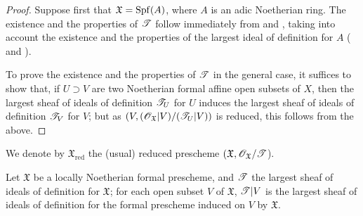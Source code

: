 \begin{proof}
Suppose first that $\mathfrak{X}=\operatorname{Spf}(A)$, where $A$ is an adic Noetherian ring.
The existence and the properties of $\mathscr{T}$ follow immediately from   and , taking into account the existence and the properties of the largest ideal of definition for $A$ ( and ).

To prove the existence and the properties of $\mathscr{T}$ in the general case, it suffices to show that, if $U\supset V$ are two Noetherian formal affine open subsets of $X$, then the largest sheaf of ideals of definition $\mathscr{T}_U$ for $U$ induces the largest sheaf of ideals of definition $\mathscr{T}_V$ for $V$; but as $(V,(\mathscr{O}_\mathfrak{X}|V)/(\mathscr{T}_U|V))$ is reduced, this follows from the above.
\end{proof}

We denote by $\mathfrak{X}_\text{red}$ the (usual) reduced prescheme $(\mathfrak{X},\mathscr{O}_\mathfrak{X}/\mathscr{T}$).

\begin{corollary}[10.5.5]
\label{I.10.5.5}
Let $\mathfrak{X}$ be a locally Noetherian formal prescheme, and $\mathscr{T}$ the largest sheaf of ideals of definition for $\mathfrak{X}$; for each open subset $V$ of $\mathfrak{X}$, $\mathscr{T}|V$ is the largest sheaf of ideals of definition for the formal prescheme induced on $V$ by $\mathfrak{X}$.
\end{corollary}

